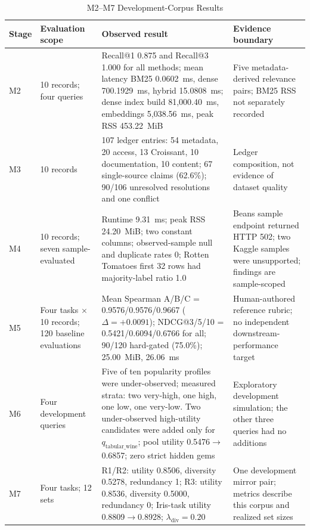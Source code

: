 \documentclass[conference]{IEEEtran}
\begin{document}
\begin{table}[t]
\caption{M2--M7 Development-Corpus Results}
\label{tab:development-results}
\centering
\footnotesize
\begin{tabularx}{\textwidth}{p{0.42in}p{0.90in}X p{1.45in}}
\toprule
Stage & Evaluation scope & Observed result & Evidence boundary \\
\midrule
M2 & 10 records; four queries & Recall@1 0.875 and Recall@3 1.000 for all methods; mean latency BM25 0.0602~ms, dense 700.1929~ms, hybrid 15.0808~ms; dense index build 81{,}000.40~ms, embeddings 5{,}038.56~ms, peak RSS 453.22~MiB & Five metadata-derived relevance pairs; BM25 RSS not separately recorded \\
M3 & 10 records & 107 ledger entries: 54 metadata, 20 access, 13 Croissant, 10 documentation, 10 content; 67 single-source claims (62.6\%); 90/106 unresolved resolutions and one conflict & Ledger composition, not evidence of dataset quality \\
M4 & 10 records; seven sample-evaluated & Runtime 9.31~ms; peak RSS 24.20~MiB; two constant columns; observed-sample null and duplicate rates 0; Rotten Tomatoes first 32 rows had majority-label ratio 1.0 & Beans sample endpoint returned HTTP 502; two Kaggle samples were unsupported; findings are sample-scoped \\
M5 & Four tasks $\times$ 10 records; 120 baseline evaluations & Mean Spearman A/B/C = 0.9576/0.9576/0.9667 ($\Delta=+0.0091$); NDCG@3/5/10 = 0.5421/0.6094/0.6766 for all; 90/120 hard-gated (75.0\%); 25.00~MiB, 26.06~ms & Human-authored reference rubric; no independent downstream-performance target \\
M6 & Four development queries & Five of ten popularity profiles were under-observed; measured strata: two very-high, one high, one low, one very-low. Two under-observed high-utility candidates were added only for $q_{\mathrm{tabular\_wine}}$; pool utility 0.5476$\to$0.6857; zero strict hidden gems & Exploratory development simulation; the other three queries had no additions \\
M7 & Four tasks; 12 sets & R1/R2: utility 0.8506, diversity 0.5278, redundancy 1; R3: utility 0.8536, diversity 0.5000, redundancy 0; Iris-task utility 0.8809$\to$0.8928; $\lambda_{\mathrm{div}}=0.20$ & One development mirror pair; metrics describe this corpus and realized set sizes \\
\bottomrule
\end{tabularx}
\end{table}
\end{document}
